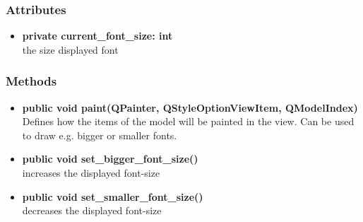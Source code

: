\subsubsection{Attributes}
\begin{itemize}
  \item \textbf{private current\_font\_size: int}\\
  the size displayed font
\end{itemize}
\subsubsection{Methods}
\begin{itemize}
  \item \textbf{public void paint(QPainter, QStyleOptionViewItem,
  QModelIndex)}\\
  Defines how the items of the model will be painted in the view. Can be used to draw e.g. bigger or smaller fonts.
  \item \textbf{public void set\_bigger\_font\_size()}\\
  increases the displayed font-size
  \item \textbf{public void set\_smaller\_font\_size()}\\
  decreases the displayed font-size
\end{itemize}

\newpage
